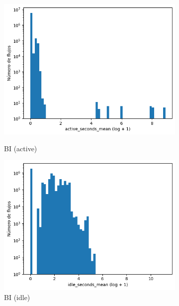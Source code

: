 \begin{figure}[H]
\begin{subfigure}[b]{0.26\textwidth}
        \includegraphics[width=\linewidth]{media/packet_pincer_botiot/active_seconds_mean_log_x_log_y.png}
        \caption{BI (active)}
        \includegraphics[width=\linewidth]{media/packet_pincer_botiot/idle_seconds_mean_log_x_log_y.png}
        \caption{BI (idle)}
    \end{subfigure}
    \hfill
    \begin{subfigure}[b]{0.26\textwidth}
        \centering

\end{subfigure}
\end{figure}
